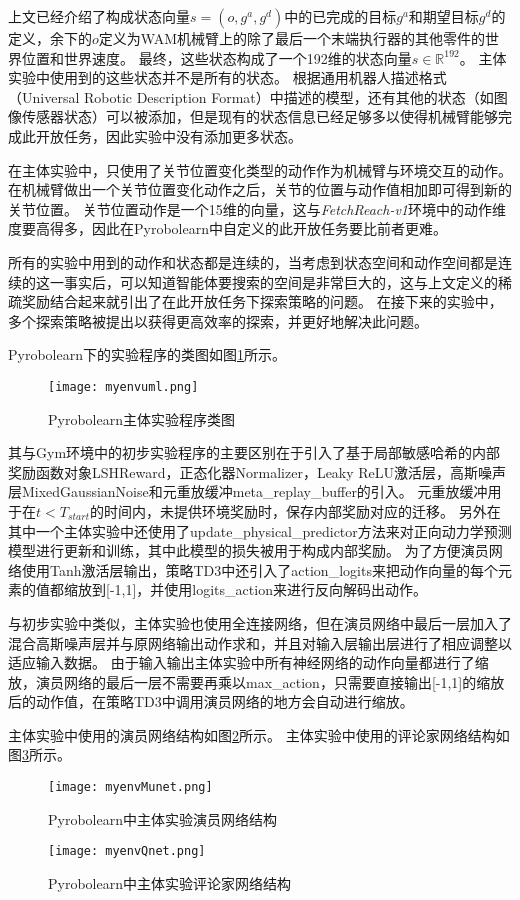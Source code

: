 上文已经介绍了构成状态向量$s=(o, g^a, g^d)$中的已完成的目标$g^a$和期望目标$g^d$的定义，余下的$o$定义为WAM机械臂上的除了最后一个末端执行器的其他零件的世界位置和世界速度。
最终，这些状态构成了一个192维的状态向量$s\in \mathbb R^{192}$。
主体实验中使用到的这些状态并不是所有的状态。
根据通用机器人描述格式（Universal Robotic Description Format）中描述的模型，还有其他的状态（如图像传感器状态）可以被添加，但是现有的状态信息已经足够多以使得机械臂能够完成此开放任务，因此实验中没有添加更多状态。

在主体实验中，只使用了关节位置变化类型的动作作为机械臂与环境交互的动作。
在机械臂做出一个关节位置变化动作之后，关节的位置与动作值相加即可得到新的关节位置。
关节位置动作是一个15维的向量，这与\emph{FetchReach-v1}环境中的动作维度要高得多，因此在Pyrobolearn中自定义的此开放任务要比前者更难。

所有的实验中用到的动作和状态都是连续的，当考虑到状态空间和动作空间都是连续的这一事实后，可以知道智能体要搜索的空间是非常巨大的，这与上文定义的稀疏奖励结合起来就引出了在此开放任务下探索策略的问题。
在接下来的实验中，多个探索策略被提出以获得更高效率的探索，并更好地解决此问题。

Pyrobolearn下的实验程序的类图如图\ref{myenvuml}所示。
    \begin{figure}
        \centering
        \texttt{[image: myenvuml.png]}
        \caption{Pyrobolearn主体实验程序类图}
        \label{myenvuml}
    \end{figure}
    其与Gym环境中的初步实验程序的主要区别在于引入了基于局部敏感哈希的内部奖励函数对象LSHReward，正态化器Normalizer，Leaky ReLU激活层，高斯噪声层MixedGaussianNoise和元重放缓冲meta\_replay\_buffer的引入。
    元重放缓冲用于在$t<T_{start}$的时间内，未提供环境奖励时，保存内部奖励对应的迁移。
    另外在其中一个主体实验中还使用了update\_physical\_predictor方法来对正向动力学预测模型进行更新和训练，其中此模型的损失被用于构成内部奖励。
    为了方便演员网络使用Tanh激活层输出，策略TD3中还引入了action\_logits来把动作向量的每个元素的值都缩放到[-1,1]，并使用logits\_action来进行反向解码出动作。

    与初步实验中类似，主体实验也使用全连接网络，但在演员网络中最后一层加入了混合高斯噪声层并与原网络输出动作求和，并且对输入层输出层进行了相应调整以适应输入数据。
    由于输入输出主体实验中所有神经网络的动作向量都进行了缩放，演员网络的最后一层不需要再乘以max\_action，只需要直接输出[-1,1]的缩放后的动作值，在策略TD3中调用演员网络的地方会自动进行缩放。

    主体实验中使用的演员网络结构如图\ref{myenvMunet}所示。
    主体实验中使用的评论家网络结构如图\ref{myenvQnet}所示。
    \begin{figure}
        \centering
        \texttt{[image: myenvMunet.png]}
        \caption{Pyrobolearn中主体实验演员网络结构}
        \label{myenvMunet}
    \end{figure}

    \begin{figure}
        \centering
        \texttt{[image: myenvQnet.png]}
        \caption{Pyrobolearn中主体实验评论家网络结构}
        \label{myenvQnet}
    \end{figure}
